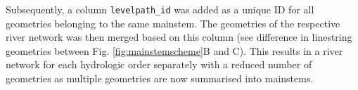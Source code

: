 \documentclass[fleqn,10pt]{wlscirep}
\newenvironment{Shaded}{\begin{snugshade}}{\end{snugshade}}
\newcommand{\AttributeTok}[1]{\textcolor[rgb]{0.77,0.63,0.00}{#1}}
\newcommand{\ConstantTok}[1]{\textcolor[rgb]{0.00,0.00,0.00}{#1}}
\newcommand{\ControlFlowTok}[1]{\textcolor[rgb]{0.13,0.29,0.53}{\textbf{#1}}}
\newcommand{\DecValTok}[1]{\textcolor[rgb]{0.00,0.00,0.81}{#1}}
\newcommand{\FunctionTok}[1]{\textcolor[rgb]{0.00,0.00,0.00}{#1}}
\newcommand{\NormalTok}[1]{#1}
\newcommand{\OtherTok}[1]{\textcolor[rgb]{0.56,0.35,0.01}{#1}}
\newcommand{\SpecialCharTok}[1]{\textcolor[rgb]{0.00,0.00,0.00}{#1}}
\newcommand{\StringTok}[1]{\textcolor[rgb]{0.31,0.60,0.02}{#1}}
\begin{document}
\begin{Shaded}
\end{Shaded}

\normalsize

Subsequently, a column \texttt{levelpath\_id} was added as a unique ID for all geometries belonging to the same mainstem. The geometries of the respective river network was then merged based on this column (see difference in linestring geometries between Fig. \ref{fig:mainstemscheme}B and C). This results in a river network for each hydrologic order separately with a reduced number of geometries as multiple geometries are now summarised into mainstems.
\end{document}
